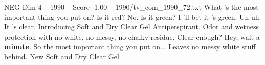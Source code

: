 \begin{textsample}{NEG Dim 4 – 1990 – Score -1.00 – 1990/tv\_com\_1990\_72.txt}  \label{ex:f4_neg_076}
What 's the most important thing you put on?
Is it red?
No.
Is it green?
I 'll bet it 's green.
Uh-uh.
It 's clear.
Introducing Soft and Dry Clear Gel Antiperspirant.
Odor and wetness protection with no white, no messy, no chalky residue.
Clear enough?
Hey, wait a \textbf{minute}.
So the most important thing you put on...
Leaves no messy white stuff behind.
New Soft and Dry Clear Gel.

\end{textsample}
